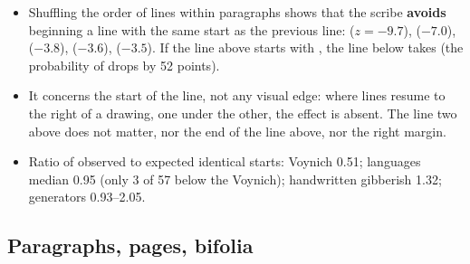 \begin{itemize}
\item Shuffling the order of lines within paragraphs shows that the scribe \textbf{avoids} beginning a line with the same
  start as the previous line:  ($z = -9.7$),  ($-7.0$),  ($-3.8$),  ($-3.6$), 
  ($-3.5$). If the line above starts with , the line below takes  (the probability of  drops by
  52 points).
\item It concerns the start of the line, not any visual edge: where lines resume to the right of a drawing, one under the
  other, the effect is absent. The line two above does not matter, nor the end of the line above, nor the right margin.
\item Ratio of observed to expected identical starts: Voynich 0.51; languages median 0.95 (only 3 of 57 below the
  Voynich); handwritten gibberish 1.32; generators 0.93--2.05.
\end{itemize}

\subsection{Paragraphs, pages, bifolia}

